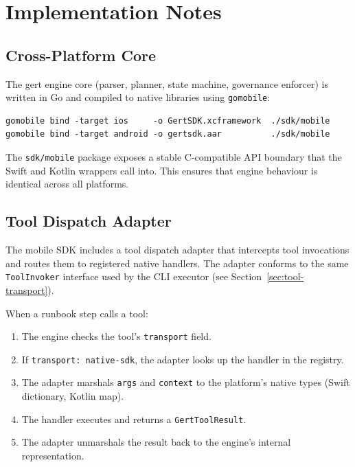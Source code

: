 \section{Implementation Notes}

\subsection{Cross-Platform Core}

The gert engine core (parser, planner, state machine, governance enforcer) is written in Go and compiled to native libraries using \texttt{gomobile}:

\begin{verbatim}
gomobile bind -target ios     -o GertSDK.xcframework  ./sdk/mobile
gomobile bind -target android -o gertsdk.aar          ./sdk/mobile
\end{verbatim}

The \texttt{sdk/mobile} package exposes a stable C-compatible API boundary that the Swift and Kotlin wrappers call into. This ensures that engine behaviour is identical across all platforms.

\subsection{Tool Dispatch Adapter}

The mobile SDK includes a tool dispatch adapter that intercepts tool invocations and routes them to registered native handlers. The adapter conforms to the same \texttt{ToolInvoker} interface used by the CLI executor (see Section~\ref{sec:tool-transport}).

When a runbook step calls a tool:

\begin{enumerate}
  \item The engine checks the tool's \texttt{transport} field.
  \item If \texttt{transport: native-sdk}, the adapter looks up the handler in the registry.
  \item The adapter marshals \texttt{args} and \texttt{context} to the platform's native types (Swift dictionary, Kotlin map).
  \item The handler executes and returns a \texttt{GertToolResult}.
  \item The adapter unmarshals the result back to the engine's internal representation.
\end{enumerate}

